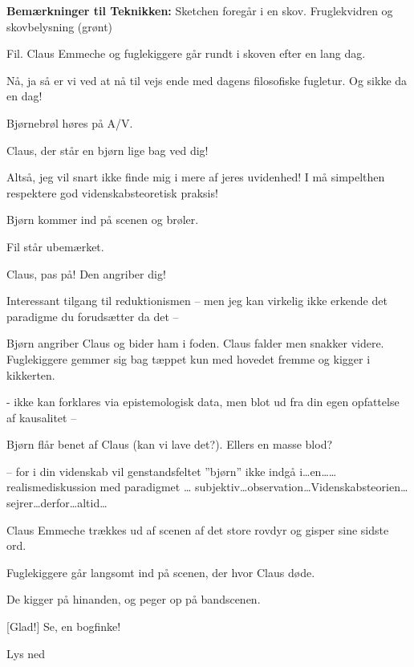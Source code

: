 \documentclass[a4paper,12pt]{article}
\begin{document}
\begin{sketch}



\scene \textbf{Bemærkninger til Teknikken:}
Sketchen foregår i en skov. Fruglekvidren og skovbelysning (grønt)


\scene Fil. Claus Emmeche og fuglekiggere går rundt i skoven efter en lang dag.

Nå, ja så er vi ved at nå til vejs ende med dagens filosofiske fugletur. Og sikke da en dag! 

 Bjørnebrøl høres på A/V.

Claus, der står en bjørn lige bag ved dig!

Altså, jeg vil snart ikke finde mig i mere af jeres uvidenhed! I må simpelthen respektere god videnskabsteoretisk praksis!

\scene Bjørn kommer ind på scenen og brøler.

\scene Fil står ubemærket. 

Claus, pas på! Den angriber dig!

Interessant tilgang til reduktionismen -- men jeg kan virkelig ikke erkende det paradigme du forudsætter da det --

\scene Bjørn angriber Claus og bider ham i foden. Claus falder men snakker videre. Fuglekiggere gemmer sig bag tæppet kun med hovedet fremme og kigger i kikkerten.

- ikke kan forklares via epistemologisk data, men blot ud fra din egen opfattelse af kausalitet --

\scene Bjørn flår benet af Claus (kan vi lave det?). Ellers en masse blod?

-- for i din videnskab vil genstandsfeltet ''bjørn'' ikke indgå i\ldots en\ldots  {}\ldots  realismediskussion med paradigmet \ldots {} subjektiv\ldots observation\ldots Videnskabsteorien\ldots  sejrer\ldots  derfor\ldots altid\ldots 

\scene Claus Emmeche trækkes ud af scenen af det store rovdyr og gisper sine sidste ord.

\scene Fuglekiggere går langsomt ind på scenen, der hvor Claus døde.

\scene De kigger på hinanden, og peger op på bandscenen.

[Glad!] Se, en bogfinke!

\scene Lys ned


\end{sketch}
\end{document}
